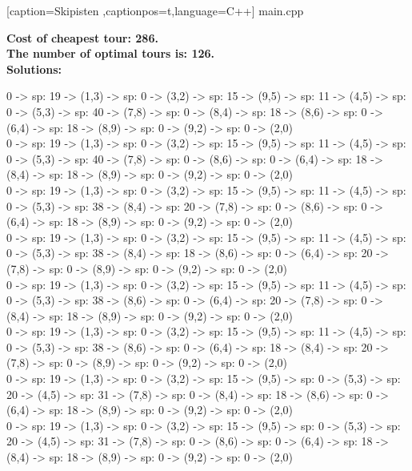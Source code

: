 \documentclass[10pt,a4paper]{article}
\author{Janos und Felix}
\begin{document}
 
    [caption={Skipisten}
       ,captionpos=t,language=C++]
 {main.cpp}
 
 
\textbf{Cost of cheapest tour: 286.}\\
\textbf{The number of optimal tours is: 126.}\\

\textbf{Solutions:}

0 -> sp: 19 -> (1,3) -> sp: 0 -> (3,2) -> sp: 15 -> (9,5) -> sp: 11 -> (4,5) -> sp: 0 -> (5,3) -> sp: 40 -> (7,8) -> sp: 0 -> (8,4) -> sp: 18 -> (8,6) -> sp: 0 -> (6,4) -> sp: 18 -> (8,9) -> sp: 0 -> (9,2) -> sp: 0 -> (2,0)\\

0 -> sp: 19 -> (1,3) -> sp: 0 -> (3,2) -> sp: 15 -> (9,5) -> sp: 11 -> (4,5) -> sp: 0 -> (5,3) -> sp: 40 -> (7,8) -> sp: 0 -> (8,6) -> sp: 0 -> (6,4) -> sp: 18 -> (8,4) -> sp: 18 -> (8,9) -> sp: 0 -> (9,2) -> sp: 0 -> (2,0)\\

0 -> sp: 19 -> (1,3) -> sp: 0 -> (3,2) -> sp: 15 -> (9,5) -> sp: 11 -> (4,5) -> sp: 0 -> (5,3) -> sp: 38 -> (8,4) -> sp: 20 -> (7,8) -> sp: 0 -> (8,6) -> sp: 0 -> (6,4) -> sp: 18 -> (8,9) -> sp: 0 -> (9,2) -> sp: 0 -> (2,0)\\

0 -> sp: 19 -> (1,3) -> sp: 0 -> (3,2) -> sp: 15 -> (9,5) -> sp: 11 -> (4,5) -> sp: 0 -> (5,3) -> sp: 38 -> (8,4) -> sp: 18 -> (8,6) -> sp: 0 -> (6,4) -> sp: 20 -> (7,8) -> sp: 0 -> (8,9) -> sp: 0 -> (9,2) -> sp: 0 -> (2,0)\\

0 -> sp: 19 -> (1,3) -> sp: 0 -> (3,2) -> sp: 15 -> (9,5) -> sp: 11 -> (4,5) -> sp: 0 -> (5,3) -> sp: 38 -> (8,6) -> sp: 0 -> (6,4) -> sp: 20 -> (7,8) -> sp: 0 -> (8,4) -> sp: 18 -> (8,9) -> sp: 0 -> (9,2) -> sp: 0 -> (2,0)\\

0 -> sp: 19 -> (1,3) -> sp: 0 -> (3,2) -> sp: 15 -> (9,5) -> sp: 11 -> (4,5) -> sp: 0 -> (5,3) -> sp: 38 -> (8,6) -> sp: 0 -> (6,4) -> sp: 18 -> (8,4) -> sp: 20 -> (7,8) -> sp: 0 -> (8,9) -> sp: 0 -> (9,2) -> sp: 0 -> (2,0)\\

0 -> sp: 19 -> (1,3) -> sp: 0 -> (3,2) -> sp: 15 -> (9,5) -> sp: 0 -> (5,3) -> sp: 20 -> (4,5) -> sp: 31 -> (7,8) -> sp: 0 -> (8,4) -> sp: 18 -> (8,6) -> sp: 0 -> (6,4) -> sp: 18 -> (8,9) -> sp: 0 -> (9,2) -> sp: 0 -> (2,0)\\

0 -> sp: 19 -> (1,3) -> sp: 0 -> (3,2) -> sp: 15 -> (9,5) -> sp: 0 -> (5,3) -> sp: 20 -> (4,5) -> sp: 31 -> (7,8) -> sp: 0 -> (8,6) -> sp: 0 -> (6,4) -> sp: 18 -> (8,4) -> sp: 18 -> (8,9) -> sp: 0 -> (9,2) -> sp: 0 -> (2,0)\\
\end{document}
